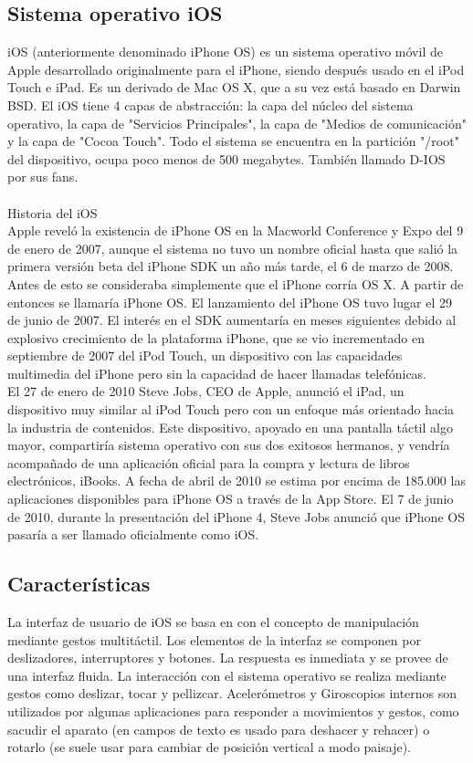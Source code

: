 	\subsection{Sistema operativo iOS}
	iOS (anteriormente denominado iPhone OS) es un sistema operativo móvil de Apple desarrollado originalmente para el iPhone, siendo después usado en el iPod Touch e iPad. Es un derivado de Mac OS X, que a su vez está basado en Darwin BSD. El iOS tiene 4 capas de abstracción: la capa del núcleo del sistema operativo, la capa de "Servicios Principales", la capa de "Medios de comunicación" y la capa de "Cocoa Touch". Todo el sistema se encuentra en la partición "/root" del dispositivo, ocupa poco menos de 500 megabytes. También llamado D-IOS por sus fans.\\ \\
	Historia del iOS\\
	Apple reveló la existencia de iPhone OS en la Macworld Conference y Expo del 9 de enero de 2007, aunque el sistema no tuvo un nombre oficial hasta que salió la primera versión beta del iPhone SDK un año más tarde, el 6 de marzo de 2008. Antes de esto se consideraba simplemente que el iPhone corría OS X. A partir de entonces se llamaría iPhone OS. El lanzamiento del iPhone OS tuvo lugar el 29 de junio de 2007. El interés en el SDK aumentaría en meses siguientes debido al explosivo crecimiento de la plataforma iPhone, que se vio incrementado en septiembre de 2007 del iPod Touch, un dispositivo con las capacidades multimedia del iPhone pero sin la capacidad de hacer llamadas telefónicas. \\
	
	El 27 de enero de 2010 Steve Jobs, CEO de Apple, anunció el iPad, un dispositivo muy similar al iPod Touch pero con un enfoque más orientado hacia la industria de contenidos. Este dispositivo, apoyado en una pantalla táctil algo mayor, compartiría sistema operativo con sus dos exitosos hermanos, y vendría acompañado de una aplicación oficial para la compra y lectura de libros electrónicos, iBooks. A fecha de abril de 2010 se estima por encima de 185.000 las aplicaciones disponibles para iPhone OS a través de la App Store. El 7 de junio de 2010, durante la presentación del iPhone 4, Steve Jobs anunció que iPhone OS pasaría a ser llamado oficialmente como iOS.
	\subsection{Características}
	La interfaz de usuario de iOS se basa en con el concepto de manipulación mediante gestos multitáctil. Los elementos de la interfaz se componen por deslizadores, interruptores y botones. La respuesta es inmediata y se provee de una interfaz fluida. La interacción con el sistema operativo se realiza mediante gestos como deslizar, tocar y pellizcar. Acelerómetros y Giroscopios internos son utilizados por algunas aplicaciones para responder a movimientos y gestos, como sacudir el aparato (en campos de texto es usado para deshacer y rehacer) o rotarlo (se suele usar para cambiar de posición vertical a modo paisaje). \\
	
